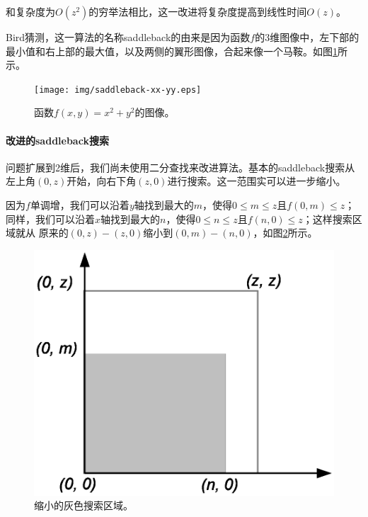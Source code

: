 \documentclass[UTF8]{article}
\begin{document}
和复杂度为$O(z^2)$的穷举法相比，这一改进将复杂度提高到线性时间$O(z)$。

Bird猜测，这一算法的名称saddleback的由来是因为函数$f$的3维图像中，左下部的最小值和右上部的最大值，以及两侧的翼形图像，合起来像一个马鞍。如图\ref{fig:saddleback-frame}所示。

\begin{figure}[htbp]
 \centering
 \texttt{[image: img/saddleback-xx-yy.eps]}
 \caption{函数$f(x, y) = x^2 + y^2$的图像。}
 \label{fig:saddleback-frame}
\end{figure}

\paragraph{改进的saddleback搜索}

问题扩展到2维后，我们尚未使用二分查找来改进算法。基本的saddleback搜索从左上角$(0, z)$开始，向右下角$(z, 0)$进行搜索。这一范围实可以进一步缩小。

因为$f$单调增，我们可以沿着$y$轴找到最大的$m$，使得$0 \leq m \leq z$且$f(0, m) \leq z$；同样，我们可以沿着$x$轴找到最大的$n$，使得$0 \leq n \leq z$且$f(n, 0) \leq z$；这样搜索区域就从 原来的$(0, z) - (z, 0)$缩小到$(0, m) - (n, 0)$，如图\ref{fig:saddleback-2}所示。

\begin{figure}[htbp]
 \centering
 \includegraphics[scale=0.5]{img/saddleback-2.eps}
 \caption{缩小的灰色搜索区域。}
 \label{fig:saddleback-2}
\end{figure}
\end{document}
